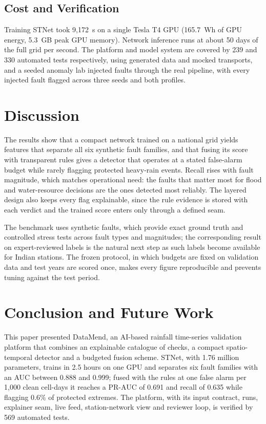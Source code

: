 \documentclass[conference,a4paper]{IEEEtran}
\begin{document}
\subsection{Cost and Verification}
Training STNet took 9,172~s on a single Tesla T4 GPU (165.7~Wh of GPU energy, 5.3~GB peak GPU memory). Network inference runs at about 50 days of the full grid per second. The platform and model system are covered by 239 and 330 automated tests respectively, using generated data and mocked transports, and a seeded anomaly lab injected faults through the real pipeline, with every injected fault flagged across three seeds and both profiles.

\section{Discussion}\label{sec:disc}
The results show that a compact network trained on a national grid yields features that separate all six synthetic fault families, and that fusing its score with transparent rules gives a detector that operates at a stated false-alarm budget while rarely flagging protected heavy-rain events. Recall rises with fault magnitude, which matches operational need: the faults that matter most for flood and water-resource decisions are the ones detected most reliably. The layered design also keeps every flag explainable, since the rule evidence is stored with each verdict and the trained score enters only through a defined seam.

The benchmark uses synthetic faults, which provide exact ground truth and controlled stress tests across fault types and magnitudes; the corresponding result on expert-reviewed labels is the natural next step as such labels become available for Indian stations. The frozen protocol, in which budgets are fixed on validation data and test years are scored once, makes every figure reproducible and prevents tuning against the test period.

\section{Conclusion and Future Work}\label{sec:concl}
This paper presented DataMend, an AI-based rainfall time-series validation platform that combines an explainable catalogue of checks, a compact spatio-temporal detector and a budgeted fusion scheme. STNet, with 1.76 million parameters, trains in 2.5 hours on one GPU and separates six fault families with an AUC between 0.888 and 0.999; fused with the rules at one false alarm per 1,000 clean cell-days it reaches a PR-AUC of 0.691 and recall of 0.635 while flagging 0.6\% of protected extremes. The platform, with its input contract, runs, explainer seam, live feed, station-network view and reviewer loop, is verified by 569 automated tests.
\end{document}
